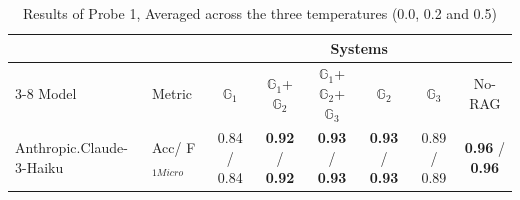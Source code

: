 \begin{table}[ht] 
\centering 
\caption{Results of Probe 1, Averaged across the three temperatures (0.0, 0.2 and 0.5)}
\label{tab:probe1} 
\scriptsize 
\begin{tabular}{l l c c c c c c}
\hline
\multicolumn{2}{c}{} & \multicolumn{6}{c}{Systems} \\
\cline{3-8}
Model & Metric & $\mathbb{G}_1$ & $\mathbb{G}_1$+$\mathbb{G}_2$ & $\mathbb{G}_1$+$\mathbb{G}_2$+$\mathbb{G}_3$ & $\mathbb{G}_2$ & $\mathbb{G}_3$ & No-RAG \\
\hline
\multirow{2}{*}{Anthropic.Claude-3-Haiku} & Acc/ F$_{1Micro}$ & 0.84 / 0.84 & \textbf{0.92} / \textbf{0.92} & \textbf{0.93} / \textbf{0.93} & \textbf{0.93} / \textbf{0.93} & 0.89 / 0.89 & \textbf{0.96} / \textbf{0.96} \\


\end{tabular}
\end{table}

